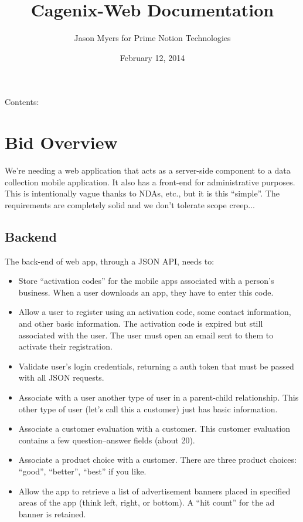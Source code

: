 \documentclass[letterpaper,10pt,english]{sphinxmanual}
\title{Cagenix-Web Documentation}
\date{February 12, 2014}
\author{Jason Myers for Prime Notion Technologies}
\begin{document}
\maketitle
\tableofcontents
{}\label{index::doc}


Contents:


\chapter{Bid Overview}
\label{dev-bid:welcome-to-cagenix-web-s-documentation}\label{dev-bid::doc}\label{dev-bid:bid-overview}
We’re needing a web application that acts as a server-side component to a data collection mobile application. It also has a front-end for administrative purposes. This is intentionally vague thanks to NDAs, etc., but it is this “simple”. The requirements are completely solid and we don’t tolerate scope creep...


\section{Backend}
\label{dev-bid:backend}
The back-end of web app, through a JSON API, needs to:
\begin{itemize}
\item {} 
Store “activation codes” for the mobile apps associated with a person’s business. When a user downloads an app, they have to enter this code.

\item {} 
Allow a user to register using an activation code, some contact information, and other basic information. The activation code is expired but still associated with the user. The user must open an email sent to them to activate their registration.

\item {} 
Validate user’s login credentials, returning a auth token that must be passed with all JSON requests.

\item {} 
Associate with a user another type of user in a parent-child relationship. This other type of user (let’s call this a customer) just has basic information.

\item {} 
Associate a customer evaluation with a customer. This customer evaluation contains a few question–answer fields (about 20).

\item {} 
Associate a product choice with a customer. There are three product choices: “good”, “better”, “best” if you like.

\item {} 
Allow the app to retrieve a list of advertisement banners placed in specified areas of the app (think left, right, or bottom). A “hit count” for the ad banner is retained.

\end{itemize}
\end{document}
